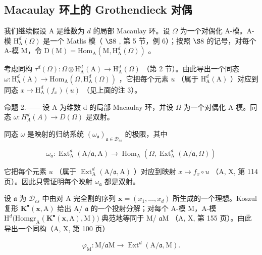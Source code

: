 \subsection{Macaulay 环上的 Grothendieck 对偶}

我们继续假设 A 是维数为 \(d\) 的局部 Macaulay 环。设 \(\Omega\) 为一个对偶化 A-模。A-模 \(\mathrm{H}_{\mathrm{A}}^{d}(\Omega)\) 是一个 Matlis 模（ \(\S 8\) , 第 5 节，例 6）；按照 \(\S 8\) 的记号，对每个 A-模 M，令 \(\mathrm{D(M)} = \mathrm{Hom}_{\mathrm{A}}(\mathrm{M}, \mathrm{H}_{\mathrm{A}}^{d}(\Omega))\) 。

考虑同构 \(\tau^{d}(\Omega):\Omega\otimes\mathrm{H}_{\mathrm{A}}^{d}(\mathrm{A})\to\mathrm{H}_{\mathrm{A}}^{d}(\Omega)\) （第 2 节）。由此导出一个同态 \(\omega:\mathrm{H}_{\mathrm{A}}^{d}(\mathrm{A})\to\mathrm{Hom}_{\mathrm{A}}(\Omega,\mathrm{H}_{\mathrm{A}}^{d}(\Omega))\) ，它把每个元素 \(u\) （属于 \(\mathrm{H}_{\mathrm{A}}^{d}(\mathrm{A})\) ）对应到同态 \(x\mapsto\mathrm{H}_{\mathrm{A}}^{d}(f_{x})(u)\) （见上面的注 3）。

命题 2.—— 设 A 为维数 d 的局部 Macaulay 环，并设 \(\Omega\) 为一个对偶化 A-模。同态 \(\omega: H_{A}^{d}(A) \to D(\Omega)\) 是双射。

同态 \(\omega\) 是映射的归纳系统 \((\omega_{\mathfrak{a}})_{\mathfrak{a}\in\mathcal{D}_{cs}}\) 的极限，其中

\[
\omega_ {\mathfrak {a}}: \operatorname{Ext} _ {\mathrm{A}} ^ {d} (\mathrm{A} / \mathfrak {a}, \mathrm{A}) \longrightarrow \operatorname{Hom} _ {\mathrm{A}} (\Omega , \operatorname{Ext} _ {\mathrm{A}} ^ {d} (\mathrm{A} / \mathfrak {a}, \Omega))
\]

它把每个元素 \(u\) （属于 \(\operatorname{Ext}_{\mathrm{A}}^{d}(\mathrm{A}/\mathfrak{a},\mathrm{A})\) ）对应到映射 \(x\mapsto f_{x}\circ u\) （A, X, 第 114 页）。因此只需证明每个映射 \(\omega_{\mathfrak{a}}\) 都是双射。

设 \(\mathfrak{a}\) 为 \(\mathcal{D}_{cs}\) 中由对 A 完全割的序列 \(\mathbf{x} = (x_1, \ldots, x_d)\) 所生成的一个理想。Koszul 复形 \(\mathbf{K}^{\bullet}(\mathbf{x}, \mathrm{A})\) 给出 A/ \(\mathfrak{a}\) 的一个投射分解；对每个 A-模 M，A-模 \(\mathrm{H}^d\big(\mathrm{Homgr}_\mathrm{A}(\mathbf{K}^{\bullet}(\mathbf{x}, \mathrm{A}), \mathrm{M})\big)\) 典范地等同于 M/ \(\mathfrak{a}\mathrm{M}\) （A, X, 第 155 页）。由此导出一个同构（A, X, 第 100 页）

\[
\varphi_ {\mathrm{M}}: \mathrm{M} / \mathfrak {a} \mathrm{M} \longrightarrow \operatorname{Ext} ^ {d} (\mathrm{A} / \mathfrak {a}, \mathrm{M}).
\]


